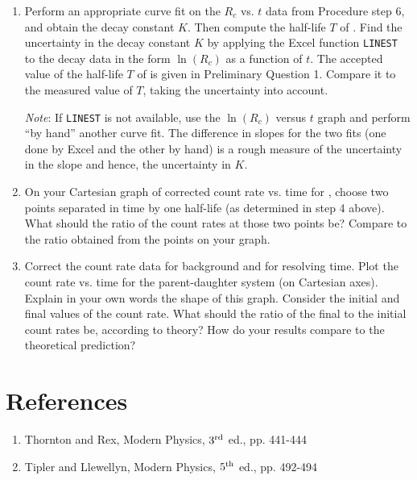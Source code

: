 \begin{enumerate}
\item Perform an appropriate curve fit on the $R_{c}$ vs. $t$ data
from Procedure step 6, and obtain the decay
constant $K$. Then compute the half-life $T$ of \bam.  Find the
uncertainty in the decay constant $K$ by applying the Excel function
{\tt LINEST} to the decay data in the form $\ln(R_{c})$ as a
function of $t$.  The accepted value of the half-life $T$ of \bam is
given in Preliminary Question 1. Compare it to the measured value of $T$,
taking the uncertainty into account.

{\em Note}: If {\tt LINEST} is not available, use the $\ln(R_{c})$ versus
$t$  graph and perform ``by hand'' another
curve fit.  The difference in slopes for the two fits (one done by
Excel and the other by hand) is a rough measure of the uncertainty in
the slope and hence, the uncertainty in $K$.

\item On your Cartesian graph of corrected count rate vs. time
for \bam, choose two points separated in time by one half-life (as
determined in step 4 above).  What should the ratio of the count rates
at those two points be?  Compare to the ratio obtained from the points
on your graph.

\item Correct the \bam count rate data for background and for
resolving time. Plot the count rate vs. time for the
parent-daughter system (on Cartesian axes).  Explain in your own words
the shape of this graph.  Consider the initial and final values of the
count rate.  What should the ratio of the final to the initial count
rates be, according to theory?  How do your results compare to the
theoretical prediction?
\end{enumerate}

\section{References}
\begin{enumerate}
\item Thornton and Rex, Modern Physics, $3^{\rm rd}$ ed., pp. 441-444
\item Tipler and Llewellyn, Modern Physics, $5^{\rm th}$ ed., pp. 492-494
\end{enumerate}
